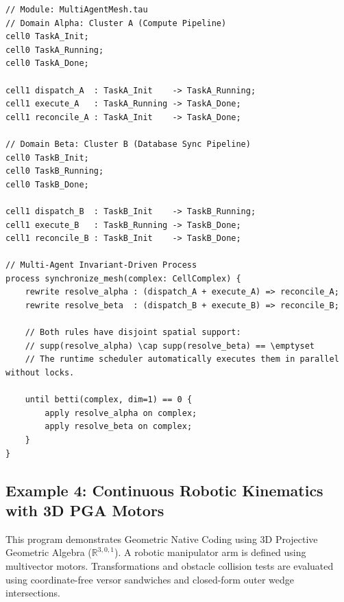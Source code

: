 \begin{lstlisting}[caption={Multi-Agent Spatial Coordination Mesh with Disjoint Execution Wavefronts.}]
// Module: MultiAgentMesh.tau
// Domain Alpha: Cluster A (Compute Pipeline)
cell0 TaskA_Init;
cell0 TaskA_Running;
cell0 TaskA_Done;

cell1 dispatch_A  : TaskA_Init    -> TaskA_Running;
cell1 execute_A   : TaskA_Running -> TaskA_Done;
cell1 reconcile_A : TaskA_Init    -> TaskA_Done;

// Domain Beta: Cluster B (Database Sync Pipeline)
cell0 TaskB_Init;
cell0 TaskB_Running;
cell0 TaskB_Done;

cell1 dispatch_B  : TaskB_Init    -> TaskB_Running;
cell1 execute_B   : TaskB_Running -> TaskB_Done;
cell1 reconcile_B : TaskB_Init    -> TaskB_Done;

// Multi-Agent Invariant-Driven Process
process synchronize_mesh(complex: CellComplex) {
    rewrite resolve_alpha : (dispatch_A + execute_A) => reconcile_A;
    rewrite resolve_beta  : (dispatch_B + execute_B) => reconcile_B;

    // Both rules have disjoint spatial support:
    // supp(resolve_alpha) \cap supp(resolve_beta) == \emptyset
    // The runtime scheduler automatically executes them in parallel without locks.

    until betti(complex, dim=1) == 0 {
        apply resolve_alpha on complex;
        apply resolve_beta on complex;
    }
}
\end{lstlisting}

\subsection{Example 4: Continuous Robotic Kinematics with 3D PGA Motors}
This program demonstrates Geometric Native Coding using 3D Projective Geometric Algebra ($\mathbb{R}^{3,0,1}$). A robotic manipulator arm is defined using multivector motors. Transformations and obstacle collision tests are evaluated using coordinate-free versor sandwiches and closed-form outer wedge intersections.

